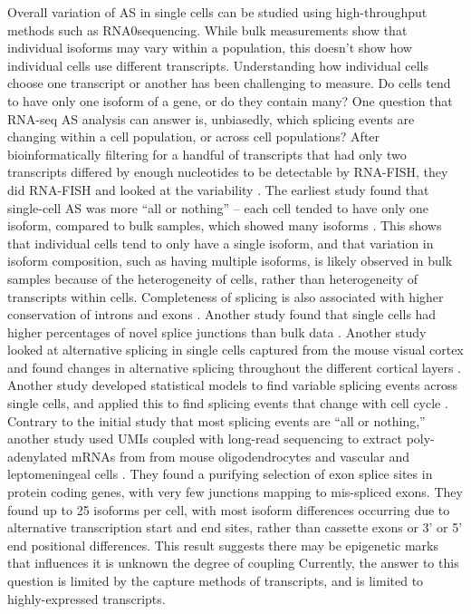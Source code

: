 Overall variation of AS in single cells can be studied using high-throughput methods such as RNA0sequencing. While bulk measurements show that individual isoforms may vary within a population, this doesn't show how individual cells use different transcripts. Understanding how individual cells choose one transcript or another has been challenging to measure. Do cells tend to have only one isoform of a gene, or do they contain many? One question that RNA-seq AS analysis can answer is, unbiasedly, which splicing events are changing within a cell population, or across cell populations? After bioinformatically filtering for a handful of transcripts that had only two transcripts differed by enough nucleotides to be detectable by RNA-FISH, they did RNA-FISH and looked at the variability \cite{Waks2011-ye}. The earliest study found that single-cell AS was more ``all or nothing'' -- each cell tended to have only one isoform, compared to bulk samples, which showed many isoforms \cite{Shalek2013-ez}. This shows that individual cells tend to only have a single isoform, and that variation in isoform composition, such as having multiple isoforms, is likely observed in bulk samples because of the heterogeneity of cells, rather than heterogeneity of transcripts within cells. Completeness of splicing is also associated with higher conservation of introns and exons \cite{Faigenbloom2015-jo}. Another study found that single cells had higher percentages of novel splice junctions than bulk data \cite{Marinov2014-iw}. Another study looked at alternative splicing in single cells captured from the mouse visual cortex and found changes in alternative splicing throughout the different cortical layers \cite{Tasic:2016jp}. Another study developed statistical models to find variable splicing events across single cells, and applied this to find splicing events that change with cell cycle \cite{Welch:2016iz}. Contrary to the initial study that most splicing events are ``all or nothing,'' another study used UMIs coupled with long-read sequencing to extract poly-adenylated mRNAs from from mouse oligodendrocytes and vascular and leptomeningeal cells \cite{Karlsson2017-wy}. They found a purifying selection of exon splice sites in protein coding genes, with very few junctions mapping to mis-spliced exons. They found up to 25 isoforms per cell, with most isoform differences occurring due to alternative transcription start and end sites, rather than cassette exons or 3' or 5' end positional differences. This result suggests there may be epigenetic marks that influences it is unknown the degree of coupling Currently, the answer to this question is limited by the capture methods of transcripts, and is limited to highly-expressed transcripts.

